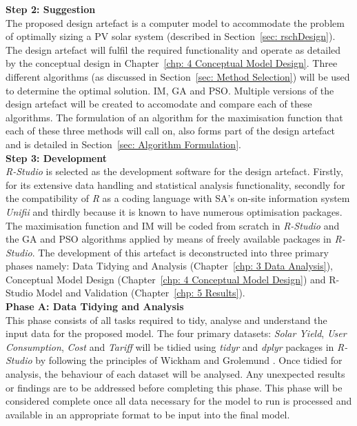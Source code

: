\documentclass[a4paper,11pt,fleqn]{report}
\begin{document}
\textbf{Step 2: Suggestion}\\
The proposed design artefact is a computer model to accommodate the problem of optimally sizing a \ac{PV} solar system (described in Section~\ref{sec: rschDesign}). The design artefact will fulfil the required functionality and operate as detailed by the conceptual design in Chapter~\ref{chp: 4 Conceptual Model Design}. Three different algorithms (as discussed in Section~\ref{sec: Method Selection}) will be used to determine the optimal solution. \ac{IM}, \ac{GA} and \ac{PSO}. Multiple versions of the design artefact will be created to accomodate and compare each of these algorithms. The formulation of an algorithm for the maximisation function that each of these three methods will call on, also forms part of the design artefact and is detailed in Section~\ref{sec: Algorithm Formulation}.\\

\textbf{Step 3: Development}\\
\textit{R-Studio} is selected as the development software for the design artefact. Firstly, for its extensive data handling and statistical analysis functionality, secondly for the compatibility of \textit{R} as a coding language with \ac{SA}'s on-site information system \textit{Unifii} and thirdly because it is known to have numerous optimisation packages. The maximisation function and \ac{IM} will be coded from scratch in \textit{R-Studio} and the \ac{GA} and \ac{PSO} algorithms applied by means of freely available packages in \textit{R-Studio}. The development of this artefact is deconstructed into three primary phases namely: Data Tidying and Analysis (Chapter~\ref{chp: 3 Data Analysis}), Conceptual Model Design (Chapter~\ref{chp: 4 Conceptual Model Design}) and R-Studio Model and Validation (Chapter~\ref{chp: 5 Results}).\\

\indent\textbf{Phase A: Data Tidying and Analysis}\label{Phase A: Data Exploration and Analysis}\\
This phase consists of all tasks required to tidy, analyse and understand the input data for the proposed model. The four primary datasets: \textit{Solar Yield}, \textit{User Consumption}, \textit{Cost} and \textit{Tariff} will be tidied using \textit{tidyr} and \textit{dplyr} packages in \textit{R-Studio} by following the principles of Wickham and Grolemund \citep{Grol2017}. Once tidied for analysis, the behaviour of each dataset will be analysed. Any unexpected results or findings are to be addressed before completing this phase. This phase will be considered complete once all data necessary for the model to run is processed and available in an appropriate format to be input into the final model.\\
\end{document}
